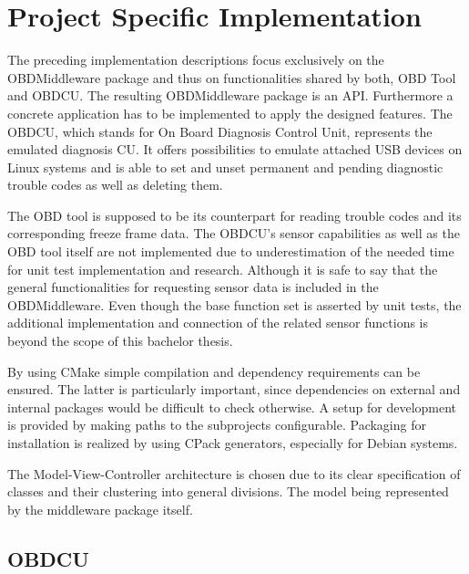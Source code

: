 

\chapter{Project Specific Implementation}
\label{sec:projectspecific} 

The preceding implementation descriptions focus exclusively on the OBDMiddleware package and thus on functionalities shared
by both, OBD Tool and OBDCU. The resulting OBDMiddleware package is an API.
Furthermore a concrete application has to be implemented to apply the designed features.
The OBDCU, which stands for On Board Diagnosis Control Unit, represents the emulated diagnosis CU.
It offers possibilities to emulate attached USB devices on Linux systems and is able to set and unset
permanent and pending diagnostic trouble codes as well as deleting them.

The OBD tool is supposed to be its counterpart for reading trouble codes and its corresponding freeze frame data.
The OBDCU’s sensor capabilities as well as the OBD tool itself are not implemented due to underestimation of the needed time for unit test 
implementation and research. 
Although it is safe to say that the general functionalities for requesting sensor data is included in the OBDMiddleware. 
Even though the base function set is asserted by unit tests,
the additional implementation and connection of the related sensor functions is beyond the scope of this bachelor thesis.

By using CMake simple compilation and dependency requirements can be ensured.
The latter is particularly important, since dependencies on external and internal packages would be difficult to check otherwise.
A setup for development is provided by making paths to the subprojects configurable. 
Packaging for installation is realized by using CPack generators, especially for Debian systems.

The Model-View-Controller architecture is chosen due to its clear specification of classes and their clustering into general divisions. 
The model being represented by the middleware package itself.

\section{OBDCU}

